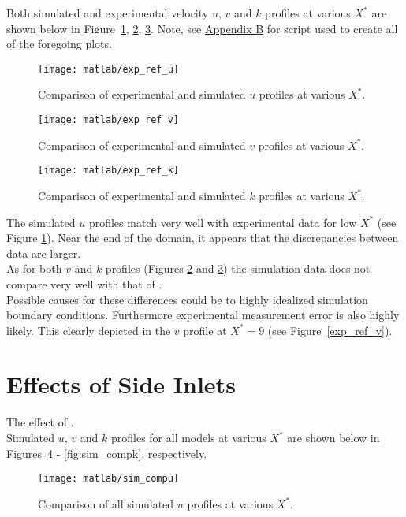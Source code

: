 Both simulated and experimental velocity $u$, $v$ and $k$ profiles at various $X^*$ are shown below in Figure~\ref{fig:exp_ref_u}, \ref{fig:exp_ref_v}, \ref{fig:exp_ref_k}. Note, see \hyperlink{appendixb}{Appendix B} for \cite{matlab} script used to create all of the foregoing plots.\\
\begin{figure}[H]
	\centering
	\texttt{[image: matlab/exp\_ref\_u]}
	\caption{Comparison of experimental and simulated $u$ profiles at various $X^*$.}
	\label{fig:exp_ref_u}
\end{figure}

\begin{figure}[H]
	\centering
	\texttt{[image: matlab/exp\_ref\_v]}
	\caption{Comparison of experimental and simulated $v$ profiles at various $X^*$.}
	\label{fig:exp_ref_v}
\end{figure}

\begin{figure}[H]
	\centering
	\texttt{[image: matlab/exp\_ref\_k]}
	\caption{Comparison of experimental and simulated $k$ profiles at various $X^*$.}
	\label{fig:exp_ref_k}
\end{figure}

The simulated $u$ profiles match very well with experimental data for low $X^*$ (see Figure  \ref{fig:exp_ref_u}). Near the end of the domain, it appears that the discrepancies between data are larger.\\

As for both $v$ and $k$ profiles (Figures \ref{fig:exp_ref_v} and \ref{fig:exp_ref_k}) the simulation data does not compare very well with that of \cite{art}.\\

Possible causes for these differences could be to highly idealized simulation boundary conditions. Furthermore experimental measurement error is also highly likely. This clearly depicted in the $v$ profile at $X^*=9$ (see Figure~\ref{exp_ref_v}).
\section{Effects of Side Inlets}
\label{sec:effects_side}
The effect of .\\

Simulated $u$, $v$ and $k$ profiles for all models at various $X^*$ are shown below in Figures~\ref{fig:sim_compu} - \ref{fig:sim_compk}, respectively.
\begin{figure}[H]
	\centering
	\texttt{[image: matlab/sim\_compu]}
	\caption{Comparison of all simulated $u$ profiles at various $X^*$.}
	\label{fig:sim_compu}
\end{figure}

